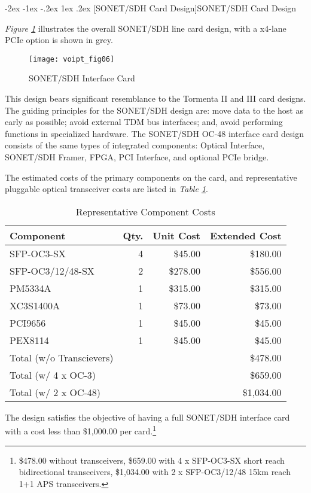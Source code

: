 \documentclass[letterpaper,final,notitlepage,twocolumn,10pt,twoside]{article}
\makeatletter
\renewcommand\section{\@startsection {section}{1}{\z@}%
                                   {-2ex \@plus -1ex \@minus -.2ex}%
                                   {1ex \@plus .2ex}%
                                   {\normalfont\large\bfseries}}
\makeatother
\begin{document}
\section[SONET/SDH Card Design]{SONET/SDH Card Design}

\textsl{Figure \ref{figure:voipt_fig06}} illustrates the overall SONET/SDH line
card design, with a x4-lane PCIe option is shown in grey.
\begin{figure}[htp]
\center\texttt{[image: voipt\_fig06]}
\caption[OC48card]{SONET/SDH Interface Card}
\label{figure:voipt_fig06}
\end{figure}
This design bears significant resemblance to the Tormenta II and III card
designs.  The guiding principles for the SONET/SDH design are: move data to the
host as early as possible; avoid external TDM bus interfaces; and, avoid
performing functions in specialized hardware.  The SONET/SDH OC-48 interface
card design consists of the same types of integrated components: Optical
Interface, SONET/SDH Framer, FPGA, PCI Interface, and optional PCIe bridge.

The estimated costs of the primary components on the card, and representative
pluggable optical transceiver costs are listed in \textsl{Table
\ref{table:components}}.
\begin{table}[htp]
\footnotesize
\begin{center}
\setlength{\tabcolsep}{0.3em}
\setlength{\arraycolsep}{0.3em}
\begin{tabular}{lrrr}\\
Component & Qty. & Unit Cost & Extended Cost\\
\hline
SFP-OC3-SX & 4 & \$45.00 & \$180.00\\
SFP-OC3/12/48-SX & 2 & \$278.00 & \$556.00\\
\hline
PM5334A & 1 & \$315.00 & \$315.00\\
XC3S1400A & 1 & \$73.00 & \$73.00\\
PCI9656 & 1 & \$45.00 & \$45.00\\
PEX8114 & 1 & \$45.00 & \$45.00\\
\hline
Total (w/o Transcievers) & & & \$478.00\\
Total (w/ 4 x OC-3) & & & \$659.00\\
Total (w/ 2 x OC-48) & & & \$1,034.00\\
\hline
\end{tabular}
\caption{Representative Component Costs}
\label{table:components}
\end{center}
\normalsize
\end{table}
The design satisfies the objective of having a full SONET/SDH interface card
with a cost less than \$1,000.00 per card.\footnote{\$478.00 without
transceivers, \$659.00 with 4 x SFP-OC3-SX short reach bidirectional
transceivers, \$1,034.00 with 2 x SFP-OC3/12/48 15km reach 1+1 APS
transceivers.}
\end{document}
